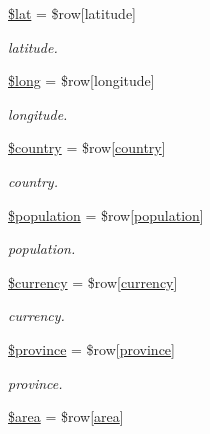 \begin{DoxyCompactItemize}
\mbox{\hyperlink{hull_2index_8php_af498b42b83afed4dfe0af05fd802776c}{\$lat}} = \$row\mbox{[}\textquotesingle{}latitude\textquotesingle{}\mbox{]}
\begin{DoxyCompactList}\small\item\em latitude. \end{DoxyCompactList}\item 
\mbox{\hyperlink{hull_2index_8php_a30223182013e2964ccbd7c134b3c52c1}{\$long}} = \$row\mbox{[}\textquotesingle{}longitude\textquotesingle{}\mbox{]}
\begin{DoxyCompactList}\small\item\em longitude. \end{DoxyCompactList}\item 
\mbox{\hyperlink{hull_2index_8php_a1437a5f6eb157f0eb267a26e0ad4f1ba}{\$country}} = \$row\mbox{[}\textquotesingle{}\mbox{\hyperlink{index_8php_a0f0752705301c982dc8994ebc993e6e9}{country}}\textquotesingle{}\mbox{]}
\begin{DoxyCompactList}\small\item\em country. \end{DoxyCompactList}\item 
\mbox{\hyperlink{hull_2index_8php_afc1939ed7d0e8629546e2bc27b02dbc1}{\$population}} = \$row\mbox{[}\textquotesingle{}\mbox{\hyperlink{index_8php_aa78fa356925cd3f67d485c4d6846202b}{population}}\textquotesingle{}\mbox{]}
\begin{DoxyCompactList}\small\item\em population. \end{DoxyCompactList}\item 
\mbox{\hyperlink{hull_2index_8php_a37d22fd3b896e9d5488f3479a4d8f451}{\$currency}} = \$row\mbox{[}\textquotesingle{}\mbox{\hyperlink{index_8php_abd84e0698c321abdbf211d5b8425d0b5}{currency}}\textquotesingle{}\mbox{]}
\begin{DoxyCompactList}\small\item\em currency. \end{DoxyCompactList}\item 
\mbox{\hyperlink{hull_2index_8php_a0bdd006d1becad76055fe31c887fdfaf}{\$province}} = \$row\mbox{[}\textquotesingle{}\mbox{\hyperlink{index_8php_a38d70414c65575df5643ad4296c9db2e}{province}}\textquotesingle{}\mbox{]}
\begin{DoxyCompactList}\small\item\em province. \end{DoxyCompactList}\item 
\mbox{\hyperlink{hull_2index_8php_a460a08379d150f8c151a07ad9a3251cd}{\$area}} = \$row\mbox{[}\textquotesingle{}\mbox{\hyperlink{index_8php_a5198216176428aa2303311f956213f33}{area}}\textquotesingle{}\mbox{]}

\end{DoxyCompactItemize}
